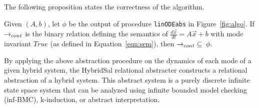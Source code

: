\documentclass{llncs}
\def\linODEabs{\tt{linODEabs}}
\newcommand\ignore[1]{{}}
\begin{document}
The following proposition states the correctness of the algorithm.
\begin{proposition}\label{prop:corr}
Given $(A,b)$, let $\phi$ be the output of 
procedure {\linODEabs} in
Figure~\ref{fig:algo}.
If $\rightarrow_{cont}$ is the binary relation defining the
semantics of $\frac{d\vec{x}}{dt} = A\vec{x}+b$ 
with mode invariant $\mathit{True}$
(as defined in Equation~\ref{eqn:sem}), then
$\rightarrow_{cont}  \;\subseteq\; \phi$.
\end{proposition}
\ignore{
\begin{proof}(Sketch)
First, let $p(\vec{x})$ be the linear expression
$\vec{c}^T\vec{y}+\vec{d}^T\vec{z}+e$ discovered in Step~(6).
Then,
\begin{eqnarray*}
\frac{dp}{dt} &=& \vec{c}^T(A_1\vec{y}+A_2\vec{z}+\vec{b_1}) +
 \vec{d}^T\vec{b_2}
\; = \; \lambda\vec{c}^T\vec{y}+\lambda\vec{d}^T\vec{z}+\vec{c}^T\vec{b_1} + \vec{d}^T\vec{b_2}
\\
& = & \lambda*(\vec{c}^T\vec{y}+\vec{d}^T\vec{z}+\vec{c})
\; = \; \lambda*p
\end{eqnarray*}
Hence, $p(\vec{x}(t)) = p(\vec{x}(0)) e^{\lambda t}$.
Therefore, the relation added in Step~(6) to $\phi$ 
will hold between an initial state $\vec{x}$ and a future
state $\vec{x'}$.

Next, consider the quadratic relations added to $\phi$ 
in Step~(11).  Let $p_1,p_2$ be as defined in Step~(10).
Then,
\begin{eqnarray*}
\frac{d(p_1^2+p_2^2)}{dt} 
& = &
 2p_1(\alpha p_1-\beta p_2)+2p_2(\beta p_1+\alpha p_2)
\; = \;
 2\alpha(p_1^2 + p_2^2)
\end{eqnarray*}
Hence, 
$p_1(\vec{x}(t))^2+p_2(\vec{x}(t))^2 = 
 (p_1(\vec{x}(0))^2+p_2(\vec{x}(0))^2) e^{2\alpha t}$,
and therefore, the relation added in Step~(11) to $\phi$
will hold between an initial state $\vec{x}$ and a future
state $\vec{x'}$.

Finally, consider the relations added in Step~(13).
It is easy to observe that every expression $s(\vec{x},\vec{x'})$ 
in the set $E$ is equal to the time $t$ taken to reach $\vec{x}'$
from $\vec{x}$ following the linear ODE dynamics.
Hence, all these expressions need to be equal, as stated in Step~(13).
\qed
\end{proof}
\endignore}

By applying the above abstraction procedure on the
dynamics of each mode of a given hybrid system,
the HybridSal relational abstracter constructs  a
relational abstraction of a hybrid system.
This abstract system is a purely discrete 
infinite state space system that can be analyzed
using infinite bounded model checking (inf-BMC), 
k-induction, or abstract interpretation.
\end{document}
